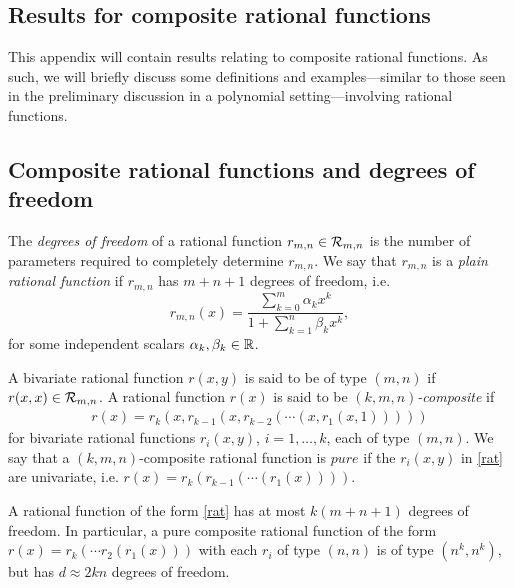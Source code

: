 \begin{appendices}

\chapter{Results for composite rational functions}\label{compratappendix}

This appendix will contain results relating to composite rational functions. As such, we will briefly discuss some definitions and examples---similar to those seen in the preliminary discussion in a polynomial setting---involving rational functions.

\section{Composite rational functions and degrees of freedom} 

\begin{defn}
The \textit{degrees of freedom} of a rational function $r_{m,n} \in \mathcal{R}_{m,n}$ is the number of parameters required to completely determine $r_{m,n}$. We say that $r_{m,n}$ is a \textit{plain rational function} if $r_{m,n}$ has $m+n+1$ degrees of freedom, i.e.
\[r_{m,n}(x) = \dfrac{\sum_{k=0}^m \alpha_k x^k}{1+\sum_{k=1}^n \beta_k x^k},\]
for some independent scalars $\alpha_k, \beta_k \in \mathbb{R}$.
\end{defn}

\begin{defn}\label{compratdef}
A bivariate rational function $r(x,y)$ is said to be of type $(m,n)$ if $r(x,x) \in \mathcal{R}_{m,n}$. A rational function $r(x)$ is said to be \textit{$(k,m,n)$-composite} if
\begin{align}
    r(x) = r_k(x,r_{k-1}(x,r_{k-2}(\cdots(x,r_1(x,1))))) \label{rat}
\end{align}
for bivariate rational functions $r_i(x,y)$, $i=1,\dots,k$, each of type $(m,n)$. We say that a $(k,m,n)$-composite rational function is $pure$ if the $r_i(x,y)$ in \eqref{rat} are univariate, i.e. $r(x) = r_k(r_{k-1}(\cdots(r_1(x))))$.
\end{defn}

\begin{ex}
A rational function of the form \eqref{rat} has at most $k(m+n+1)$ degrees of freedom. In particular, a pure composite rational function of the form $r(x)=r_k(\cdots r_2(r_1(x)))$ with each $r_i$ of type $(n,n)$ is of type $(n^k,n^k)$, but has $d\approx 2kn$ degrees of freedom.
\end{ex}


\end{appendices}
